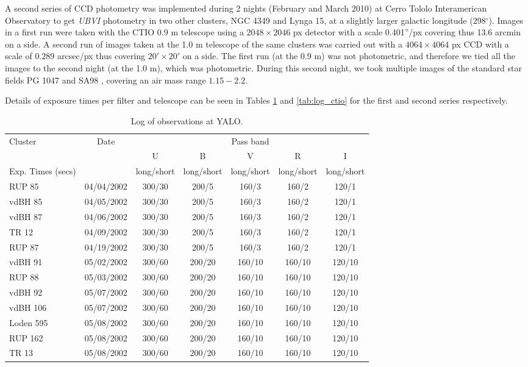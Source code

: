 \documentclass[draft]{aa}
\begin{document}
A second series of CCD photometry was implemented during 2 nights (February and
March 2010) at Cerro Tololo Interamerican Observatory to get \textit{UBVI}
photometry in two other clusters, NGC 4349 and Lynga 15, at a slightly larger
galactic longitude (298$^\circ$). Images in a first run were taken with the CTIO
0.9 m telescope using a $2048\times2046$ px detector with a scale 0.401”/px
covering thus 13.6 arcmin on a side. A second run of images taken at the 1.0 m
telescope of the same clusters was carried out with a $4064\times4064$ px CCD
with a scale of $0.289$ arcsec/px thus covering $20\prime\times20\prime$ on a
side.
%
The first run (at the 0.9 m) was not photometric, and therefore we tied all
the images to the second night (at the 1.0 m), which was photometric. During
this second night, we took multiple images of the standard star fields PG 1047
and SA98 \citep{1992AJ....104..340L}, covering an air mass range $1.15-2.2$.

Details of exposure times per filter and telescope can be seen in Tables
\ref{tab:log_yalo} and \ref{tab:log_ctio} for the first and second series respectively.\\


\begin{table}[ht]
    \centering
    \begin{tabular}{lcccccc}
    \hline 
        Cluster & Date &  &  & Pass band &  & \\
        &  & U & B & V & R & I\\
        Exp. Times (secs) &  & long/short & long/short & long/short & long/short & long/short\\
       \hline \hline 
        RUP 85 & 04/04/2002 & 300/30 & 200/5 & 160/3 & 160/2 & 120/1\\
        vdBH 85 & 04/05/2002 & 300/30 & 200/5 & 160/3 & 160/2 & 120/1\\
        vdBH 87 & 04/06/2002 & 300/30 & 200/5 & 160/3 & 160/2 & 120/1\\
        TR 12 & 04/09/2002 & 300/30 & 200/5 & 160/3 & 160/2 & 120/1\\
        RUP 87 & 04/19/2002 & 300/30 & 200/5 & 160/3 & 160/2 & 120/1\\
        vdBH 91 & 05/02/2002 & 300/60 & 200/20 & 160/10 & 160/10 & 120/10\\
        RUP 88 & 05/03/2002 & 300/60 & 200/20 & 160/10 & 160/10 & 120/10\\
        vdBH 92 & 05/07/2002 & 300/60 & 200/20 & 160/10 & 160/10 & 120/10\\
        vdBH 106 & 05/07/2002 & 300/60 & 200/20 & 160/10 & 160/10 & 120/10\\
        Loden 595 & 05/08/2002 & 300/60 & 200/20 & 160/10 & 160/10 & 120/10\\
        RUP 162 & 05/08/2002 & 300/60 & 200/20 & 160/10 & 160/10 & 120/10\\
        TR 13 & 05/08/2002 & 300/60 & 200/20 & 160/10 & 160/10 & 120/10\\
        \hline
    \end{tabular}
    \caption{Log of observations at YALO.}
    \label{tab:log_yalo}
\end{table}
\end{document}
